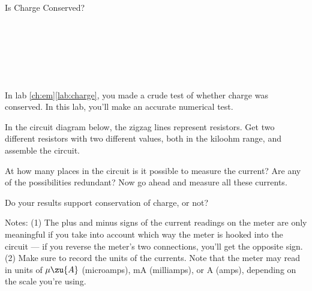 \begin{lab}[0]{Is Charge Conserved?}\label{lab:is-charge-conserved}

\apparatus
{}\\
\\
\\
\\
\\


In lab \ref{ch:em}\ref{lab:charge}, you made a crude test of whether charge was conserved. In this
lab, you'll make an accurate numerical test.

In the circuit diagram below, the zigzag lines represent resistors. Get two different
resistors with two different values, both in the kiloohm range, and assemble the
circuit.


At how many places in the circuit is it possible to measure the current? Are any of the
possibilities redundant? Now go ahead and measure all these currents.

Do your results support conservation of charge, or not?

Notes: (1) The plus and minus signs of the current readings on the meter are only
meaningful if you take into account which way the meter is hooked into the circuit ---
if you reverse the meter's two connections, you'll get the opposite sign.
(2) Make sure to record the units of the currents. Note that the meter may read in
units of $\mu\zu{A}$ (microamps), mA (milliamps), or A (amps), depending on the
scale you're using.
\end{lab}

